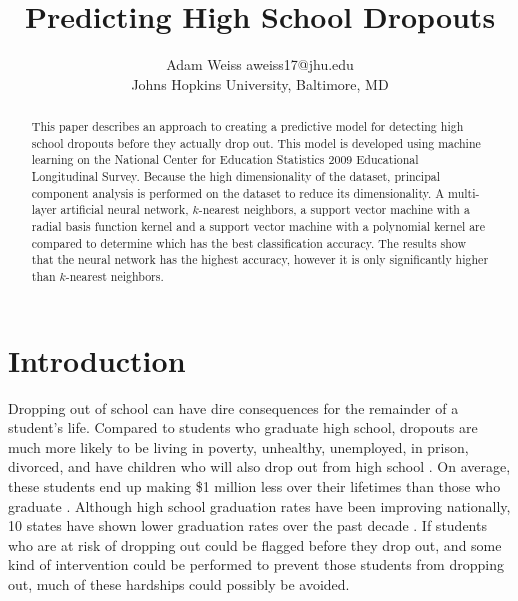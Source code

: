 \documentclass[twoside,11pt]{article}
\begin{document}
\title{Predicting High School Dropouts}

\author{\name Adam Weiss \email aweiss17@jhu.edu \\
       \addr Johns Hopkins University,
       Baltimore, MD}

\maketitle

\begin{abstract}
This paper describes an approach to creating a predictive model for detecting
high school dropouts before they actually drop out.  This model is developed
using machine learning on the National Center for Education Statistics 2009
Educational Longitudinal Survey.  Because the high dimensionality of the
dataset, principal component analysis is performed on the dataset to reduce its
dimensionality.  A multi-layer artificial neural network, $k$-nearest
neighbors, a support vector machine with a radial basis function kernel and a
support vector machine with a polynomial kernel are compared to determine which
has the best classification accuracy.  The results show that the neural network
has the highest accuracy, however it is only significantly higher than
$k$-nearest neighbors.
\end{abstract}

\section{Introduction}
\label{Introduction}
Dropping out of school can have dire consequences for the remainder of a
student's life.  Compared to students who graduate high school, dropouts are
much more likely to be living in poverty, unhealthy, unemployed, in prison,
divorced, and have children who will also drop out from high school
\cite{Bridgeland:2006}.  On average, these students end up making \$1 million
less over their lifetimes than those who graduate
\cite{Education-Statistics:1992}.  Although high school graduation rates have
been improving nationally, 10 states have shown lower graduation rates over the
past decade \cite{Balfanz:2012}.  If students who are at risk of dropping out
could be flagged before they drop out, and some kind of intervention could be
performed to prevent those students from dropping out, much of these hardships
could possibly be avoided.  
\end{document}

